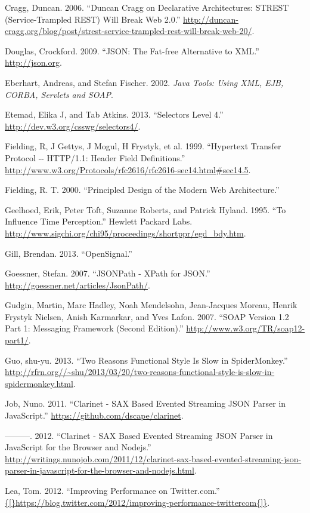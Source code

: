 \documentclass[12pt, ]{article}
\begin{document}
Cragg, Duncan. 2006. ``Duncan Cragg on Declarative Architectures: STREST
(Service-Trampled REST) Will Break Web 2.0.''
\url{http://duncan-cragg.org/blog/post/strest-service-trampled-rest-will-break-web-20/}.

Douglas, Crockford. 2009. ``JSON: The Fat-free Alternative to XML.''
\url{http://json.org}.

Eberhart, Andreas, and Stefan Fischer. 2002. \emph{Java Tools: Using
XML, EJB, CORBA, Servlets and SOAP}.

Etemad, Elika J, and Tab Atkins. 2013. ``Selectors Level 4.''
\url{http://dev.w3.org/csswg/selectors4/}.

Fielding, R, J Gettys, J Mogul, H Frystyk, et al. 1999. ``Hypertext
Transfer Protocol -{}- HTTP/1.1: Header Field Definitions.''
\url{http://www.w3.org/Protocols/rfc2616/rfc2616-sec14.html\#sec14.5}.

Fielding, R. T. 2000. ``Principled Design of the Modern Web
Architecture.''

Geelhoed, Erik, Peter Toft, Suzanne Roberts, and Patrick Hyland. 1995.
``To Influence Time Perception.'' Hewlett Packard Labs.
\url{http://www.sigchi.org/chi95/proceedings/shortppr/egd_bdy.htm}.

Gill, Brendan. 2013. ``OpenSignal.''

Goessner, Stefan. 2007. ``JSONPath - XPath for JSON.''
\url{http://goessner.net/articles/JsonPath/}.

Gudgin, Martin, Marc Hadley, Noah Mendelsohn, Jean-Jacques Moreau,
Henrik Frystyk Nielsen, Anish Karmarkar, and Yves Lafon. 2007. ``SOAP
Version 1.2 Part 1: Messaging Framework (Second Edition).''
\url{http://www.w3.org/TR/soap12-part1/}.

Guo, shu-yu. 2013. ``Two Reasons Functional Style Is Slow in
SpiderMonkey.''
\url{http://rfrn.org//~shu/2013/03/20/two-reasons-functional-style-is-slow-in-spidermonkey.html}.

Job, Nuno. 2011. ``Clarinet - SAX Based Evented Streaming JSON Parser in
JavaScript.'' \url{https://github.com/dscape/clarinet}.

---------. 2012. ``Clarinet - SAX Based Evented Streaming JSON Parser in
JavaScript for the Browser and Nodejs.''
\url{http://writings.nunojob.com/2011/12/clarinet-sax-based-evented-streaming-json-parser-in-javascript-for-the-browser-and-nodejs.html}.

Lea, Tom. 2012. ``Improving Performance on Twitter.com.''
\url{{[}https://blog.twitter.com/2012/improving-performance-twittercom{]}}.
\end{document}
